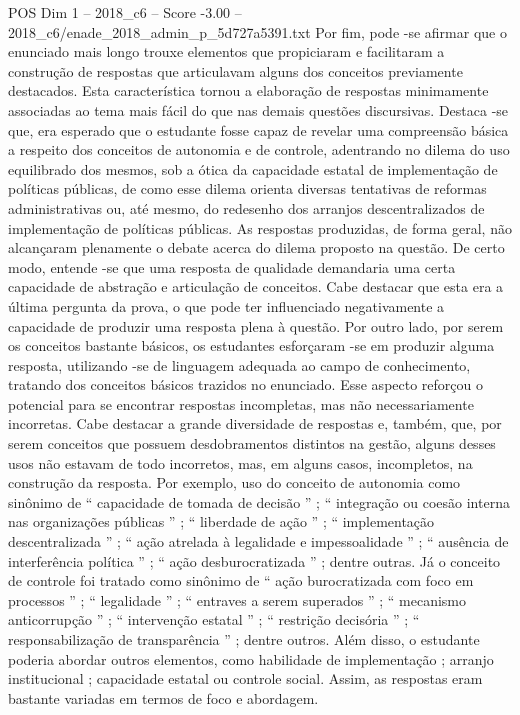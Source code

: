 \begin{textsample}{POS Dim 1 – 2018\_c6 – Score -3.00 – 2018\_c6/enade\_2018\_admin\_p\_5d727a5391.txt}
Por fim, pode -se afirmar que o enunciado mais longo trouxe elementos que propiciaram e facilitaram a construção de respostas que articulavam alguns dos conceitos previamente destacados.
Esta característica tornou a elaboração de respostas minimamente associadas ao tema mais fácil do que nas demais questões discursivas.
Destaca -se que, era esperado que o estudante fosse capaz de revelar uma compreensão básica a respeito dos conceitos de autonomia e de controle, adentrando no dilema do uso equilibrado dos mesmos, sob a ótica da capacidade estatal de implementação de políticas públicas, de como esse dilema orienta diversas tentativas de reformas administrativas ou, até mesmo, do redesenho dos arranjos descentralizados de implementação de políticas públicas.
As respostas produzidas, de forma geral, não alcançaram plenamente o debate acerca do dilema proposto na questão.
De certo modo, entende -se que uma resposta de qualidade demandaria uma certa capacidade de abstração e articulação de conceitos.
Cabe destacar que esta era a última pergunta da prova, o que pode ter influenciado negativamente a capacidade de produzir uma resposta plena à questão.
Por outro lado, por serem os conceitos bastante básicos, os estudantes esforçaram -se em produzir alguma resposta, utilizando -se de linguagem adequada ao campo de conhecimento, tratando dos conceitos básicos trazidos no enunciado.
Esse aspecto reforçou o potencial para se encontrar respostas incompletas, mas não necessariamente incorretas.
Cabe destacar a grande diversidade de respostas e, também, que, por serem conceitos que possuem desdobramentos distintos na gestão, alguns desses usos não estavam de todo incorretos, mas, em alguns casos, incompletos, na construção da resposta.
Por exemplo, uso do conceito de autonomia como sinônimo de “ capacidade de tomada de decisão ” ; “ integração ou coesão interna nas organizações públicas ” ; “ liberdade de ação ” ; “ implementação descentralizada ” ; “ ação atrelada à legalidade e impessoalidade ” ; “ ausência de interferência política ” ; “ ação desburocratizada ” ; dentre outras.
Já o conceito de controle foi tratado como sinônimo de “ ação burocratizada com foco em processos ” ; “ legalidade ” ; “ entraves a serem superados ” ; “ mecanismo anticorrupção ” ; “ intervenção estatal ” ; “ restrição decisória ” ; “ responsabilização de transparência ” ; dentre outros.
Além disso, o estudante poderia abordar outros elementos, como habilidade de implementação ; arranjo institucional ; capacidade estatal ou controle social.
Assim, as respostas eram bastante variadas em termos de foco e abordagem.

\end{textsample}
